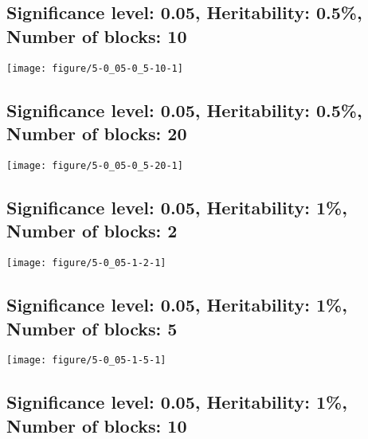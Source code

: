 \documentclass[11pt,letter]{article}\usepackage[]{graphicx}\usepackage[]{color}
\makeatletter
\def\maxwidth{ %
  \ifdim\Gin@nat@width>\linewidth
    \linewidth
  \else
    \Gin@nat@width
  \fi
}
\newenvironment{knitrout}{}{} %
\makeatother
\begin{document}
\newpage
\subsection{Significance level: 0.05, Heritability: 0.5\%, Number of blocks: 10}

\begin{knitrout}
\color{fgcolor}
\texttt{[image: figure/5-0\_05-0\_5-10-1]} 

\end{knitrout}

\newpage
\subsection{Significance level: 0.05, Heritability: 0.5\%, Number of blocks: 20}

\begin{knitrout}
\color{fgcolor}
\texttt{[image: figure/5-0\_05-0\_5-20-1]} 

\end{knitrout}

\newpage
\subsection{Significance level: 0.05, Heritability: 1\%, Number of blocks: 2}

\begin{knitrout}
\color{fgcolor}
\texttt{[image: figure/5-0\_05-1-2-1]} 

\end{knitrout}

\newpage
\subsection{Significance level: 0.05, Heritability: 1\%, Number of blocks: 5}

\begin{knitrout}
\color{fgcolor}
\texttt{[image: figure/5-0\_05-1-5-1]} 

\end{knitrout}

\newpage
\subsection{Significance level: 0.05, Heritability: 1\%, Number of blocks: 10}
\end{document}
